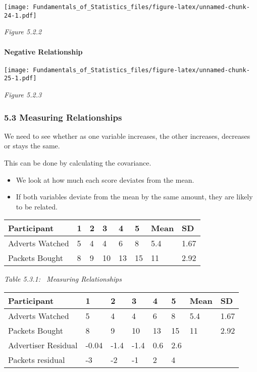 \documentclass[]{article}
\providecommand{\tightlist}{%
  \setlength{\itemsep}{0pt}\setlength{\parskip}{0pt}}
\let\oldparagraph\paragraph
\renewcommand{\paragraph}[1]{\oldparagraph{#1}\mbox{}}
\begin{document}
\texttt{[image: Fundamentals\_of\_Statistics\_files/figure-latex/unnamed-chunk-24-1.pdf]}

\emph{Figure 5.2.2}

\hypertarget{negative-relationship}{%
\paragraph{Negative Relationship}\label{negative-relationship}}

\texttt{[image: Fundamentals\_of\_Statistics\_files/figure-latex/unnamed-chunk-25-1.pdf]}

\emph{Figure 5.2.3}

\hypertarget{measuring-relationships}{%
\subsubsection{5.3 Measuring
Relationships}\label{measuring-relationships}}

We need to see whether as one variable increases, the other increases,
decreases or stays the same.

This can be done by calculating the covariance.

\begin{itemize}
\tightlist
\item
  We look at how much each score deviates from the mean.
\item
  If both variables deviate from the mean by the same amount, they are
  likely to be related.
\end{itemize}

\begin{longtable}[]{@{}llllllll@{}}
\toprule
Participant & 1 & 2 & 3 & 4 & 5 & Mean & SD\tabularnewline
\midrule
\endhead
Adverts Watched & 5 & 4 & 4 & 6 & 8 & 5.4 & 1.67\tabularnewline
Packets Bought & 8 & 9 & 10 & 13 & 15 & 11 & 2.92\tabularnewline
\bottomrule
\end{longtable}

\emph{Table 5.3.1: ~Measuring Relationships}

\begin{longtable}[]{@{}llllllll@{}}
\toprule
Participant & 1 & 2 & 3 & 4 & 5 & Mean & SD\tabularnewline
\midrule
\endhead
Adverts Watched & 5 & 4 & 4 & 6 & 8 & 5.4 & 1.67\tabularnewline
Packets Bought & 8 & 9 & 10 & 13 & 15 & 11 & 2.92\tabularnewline
Advertiser Residual & -0.04 & -1.4 & -1.4 & 0.6 & 2.6 & &\tabularnewline
Packets residual & -3 & -2 & -1 & 2 & 4 & &\tabularnewline
\bottomrule
\end{longtable}
\end{document}
